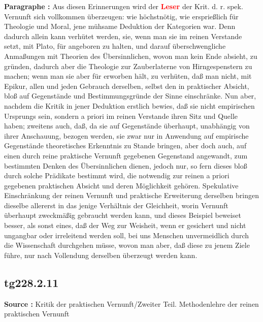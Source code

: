 \documentclass[a4paper,12pt,twoside]{book}
\newcommand{\match}[1]{\textcolor{red}{\textbf{#1}}}
\begin{document}
	\noindent\textbf{Paragraphe : }
	Aus diesen Erinnerungen wird der \match{Leser} der Krit. d. r. spek. Vernunft sich vollkommen überzeugen: wie höchstnötig, wie ersprießlich für Theologie und Moral, jene mühsame Deduktion der Kategorien war. Denn dadurch allein kann verhütet werden, sie, wenn man sie im reinen Verstande setzt, mit Plato, für angeboren zu halten, und darauf überschwengliche Anmaßungen mit Theorien des Übersinnlichen, wovon man kein Ende absieht, zu gründen, dadurch aber die Theologie zur Zauberlaterne von Hirngespenstern zu machen; wenn man sie aber für erworben hält, zu verhüten, daß man nicht, mit Epikur, allen und jeden Gebrauch derselben, selbst den in praktischer Absicht, bloß auf Gegenstände und Bestimmungsgründe der Sinne einschränke. Nun aber, nachdem die Kritik in jener Deduktion erstlich bewies, daß sie nicht empirischen Ursprungs sein, sondern a priori im reinen Verstande ihren Sitz und Quelle haben; zweitens auch, daß, da sie auf Gegenstände überhaupt, unabhängig von ihrer Anschauung, bezogen werden, sie zwar nur in Anwendung auf empirische Gegenstände theoretisches Erkenntnis zu Stande bringen, aber doch auch, auf einen durch reine praktische Vernunft gegebenen Gegenstand angewandt, zum bestimmten Denken des Übersinnlichen dienen, jedoch nur, so fern dieses bloß durch solche Prädikate bestimmt wird, die notwendig zur reinen a priori gegebenen praktischen Absicht und deren Möglichkeit gehören. Spekulative Einschränkung der reinen Vernunft und praktische Erweiterung derselben bringen dieselbe allererst in das jenige Verhältnis der Gleichheit, worin Vernunft überhaupt zweckmäßig gebraucht werden kann, und dieses Beispiel beweiset besser, als sonst eines, daß der Weg zur Weisheit, wenn er gesichert und nicht ungangbar oder irreleitend werden soll, bei uns Menschen unvermeidlich durch die Wissenschaft durchgehen müsse, wovon man aber, daß diese zu jenem Ziele führe, nur nach Vollendung derselben überzeugt werden kann. 
	
	\subsection*{tg228.2.11} 
	\textbf{Source : }Kritik der praktischen Vernunft/Zweiter Teil. Methodenlehre der reinen praktischen Vernunft\\  
	
\end{document}
